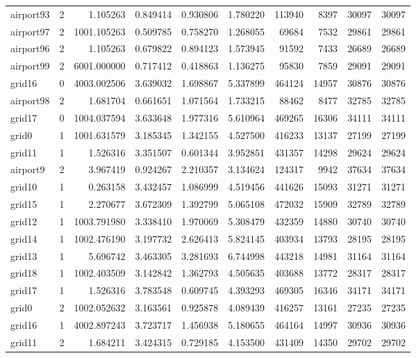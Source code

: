 \documentclass[../../../thesis.tex]{subfiles}
\begin{document}
\begin{longtable}{|l|r|r|r|r|r|r|r|r|r|}
airport93 & 2 & 1.105263 & 0.849414 & 0.930806 & 1.780220 & 113940 & 8397 & 30097 & 30097 \\
airport97 & 2 & 1001.105263 & 0.509785 & 0.758270 & 1.268055 & 69684 & 7532 & 29861 & 29861 \\
airport96 & 2 & 1.105263 & 0.679822 & 0.894123 & 1.573945 & 91592 & 7433 & 26689 & 26689 \\
airport99 & 2 & 6001.000000 & 0.717412 & 0.418863 & 1.136275 & 95830 & 7859 & 29091 & 29091 \\
grid16 & 0 & 4003.002506 & 3.639032 & 1.698867 & 5.337899 & 464124 & 14957 & 30876 & 30876 \\
airport98 & 2 & 1.681704 & 0.661651 & 1.071564 & 1.733215 & 88462 & 8477 & 32785 & 32785 \\
grid17 & 0 & 1004.037594 & 3.633648 & 1.977316 & 5.610964 & 469265 & 16306 & 34111 & 34111 \\
grid0 & 1 & 1001.631579 & 3.185345 & 1.342155 & 4.527500 & 416233 & 13137 & 27199 & 27199 \\
grid11 & 1 & 1.526316 & 3.351507 & 0.601344 & 3.952851 & 431357 & 14298 & 29624 & 29624 \\
airport9 & 2 & 3.967419 & 0.924267 & 2.210357 & 3.134624 & 124317 & 9942 & 37634 & 37634 \\
grid10 & 1 & 0.263158 & 3.432457 & 1.086999 & 4.519456 & 441626 & 15093 & 31271 & 31271 \\
grid15 & 1 & 2.270677 & 3.672309 & 1.392799 & 5.065108 & 472032 & 15909 & 32789 & 32789 \\
grid12 & 1 & 1003.791980 & 3.338410 & 1.970069 & 5.308479 & 432359 & 14880 & 30740 & 30740 \\
grid14 & 1 & 1002.476190 & 3.197732 & 2.626413 & 5.824145 & 403934 & 13793 & 28195 & 28195 \\
grid13 & 1 & 5.696742 & 3.463305 & 3.281693 & 6.744998 & 443218 & 14981 & 31164 & 31164 \\
grid18 & 1 & 1002.403509 & 3.142842 & 1.362793 & 4.505635 & 403688 & 13772 & 28317 & 28317 \\
grid17 & 1 & 1.526316 & 3.783548 & 0.609745 & 4.393293 & 469305 & 16346 & 34171 & 34171 \\
grid0 & 2 & 1002.052632 & 3.163561 & 0.925878 & 4.089439 & 416257 & 13161 & 27235 & 27235 \\
grid16 & 1 & 4002.897243 & 3.723717 & 1.456938 & 5.180655 & 464164 & 14997 & 30936 & 30936 \\
grid11 & 2 & 1.684211 & 3.424315 & 0.729185 & 4.153500 & 431409 & 14350 & 29702 & 29702 \\

\end{longtable}
\end{document}
